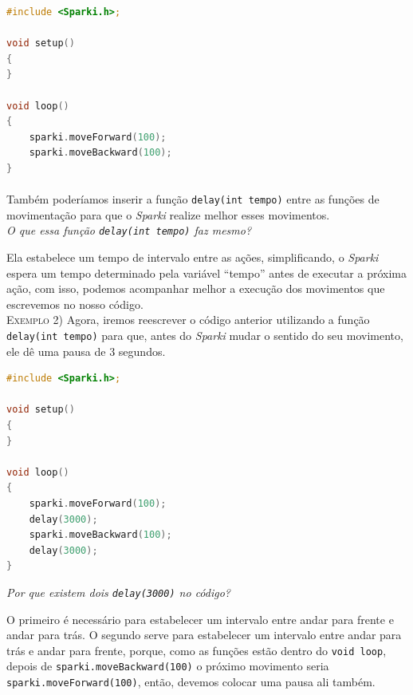     \begin{lstlisting}[language=C]
#include <Sparki.h>;

void setup()
{
}

void loop()
{
    sparki.moveForward(100);
    sparki.moveBackward(100);
}
\end{lstlisting}
    
    \paragraph{}
    Também poderíamos inserir a função \lstinline[columns=fixed]{delay(int tempo)} entre as funções de movimentação para que o \textsl{Sparki} realize melhor esses movimentos.\\
    
    \textit{O que essa função \lstinline[columns=fixed]{delay(int tempo)} faz mesmo?} \par
    Ela estabelece um tempo de intervalo entre as ações, simplificando, o \textsl{Sparki} espera um tempo determinado pela variável ``tempo'' antes de executar a próxima ação, com isso, podemos acompanhar melhor a execução dos movimentos que escrevemos no nosso código.\\
    
    \textsc{Exemplo 2)} Agora, iremos reescrever o código anterior utilizando a função \lstinline[columns=fixed]{delay(int tempo)} para que, antes do \textsl{Sparki} mudar o sentido do seu movimento, ele dê uma pausa de 3 segundos.
    
    \begin{lstlisting}[language=C]
#include <Sparki.h>;

void setup()
{
}

void loop()
{
    sparki.moveForward(100);
    delay(3000);
    sparki.moveBackward(100);
    delay(3000);
}
\end{lstlisting}
    
    \textit{Por que existem dois \lstinline[columns=fixed]{delay(3000)} no código?}
    
    O primeiro é necessário para estabelecer um intervalo entre andar para frente e andar para trás. O segundo serve para estabelecer um intervalo entre andar para trás e andar para frente, porque, como as funções estão dentro do \lstinline[columns=fixed]{void loop}, depois de \lstinline[columns=fixed]{sparki.moveBackward(100)} o próximo movimento seria \lstinline[columns=fixed]{sparki.moveForward(100)}, então, devemos colocar uma pausa ali também.  
    
